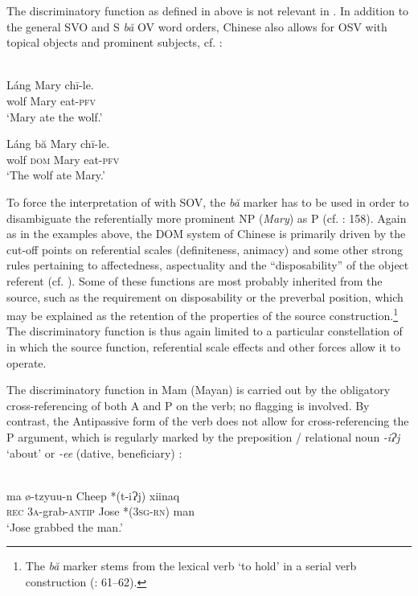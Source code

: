 \documentclass[output=paper]{langsci/langscibook}
\begin{document}
The discriminatory function as defined in  above is not relevant in . In addition to the general SVO and S \textit{bă} OV word orders, Chinese also allows for OSV with topical objects and prominent subjects, cf. :

\ea\label{ex:serzant:}
\\
\ea
\gll Láng   Mary   chī-le.\\
     wolf  Mary  eat-\textsc{pfv}\\
\glt ‘Mary ate the wolf.’

\ex
\gll Láng bă   Mary   chī-le.\\
     wolf \textsc{dom}   Mary  eat-\textsc{pfv}\\
\glt ‘The wolf ate Mary.’
\z
\z

To force the interpretation of  with SOV, the \textit{bă} marker has to be used in order to disambiguate the referentially more prominent NP (\textit{Mary}) as P (cf. \citealt{Bisang1992}: 158). Again as in the examples above, the DOM system of Chinese is primarily driven by the cut-off points on referential scales (definiteness, animacy) and some other strong rules pertaining to affectedness, aspectuality and the “disposability” of the object referent (cf. \citealt{LiThompson1981}). Some of these functions are most probably inherited from the source, such as the requirement on disposability or the preverbal position, which may be explained as the retention of the properties of the source construction.\footnote{The \textit{bă} marker stems from the lexical verb ‘to hold’ in a serial verb construction (\citealt{Sun1996}: 61–62).}  The discriminatory function is thus again limited to a particular constellation of  in which the source function, referential scale effects and other forces allow it to operate.

The discriminatory function in Mam (Mayan) is carried out by the obligatory cross-referencing of both A and P on the verb; no flagging is involved. By contrast, the Antipassive form of the verb does not allow for cross-referencing the P argument, which is regularly marked by the preposition / relational noun \textit{{}-iɁj} ‘about’ or \textit{{}-ee} (dative, beneficiary) \citep[212]{England1983}:

\ea\label{ex:serzant:}
\\
\gll ma   ø-tzyuu-n   Cheep   *(t-iɁj)   xiinaq\\
     \textsc{rec}   3\textsc{a}{}-grab-\textsc{antip}   Jose   *(3\textsc{sg}{}-\textsc{rn})   man\\
\glt ‘Jose grabbed the man.’
\z
\end{document}
